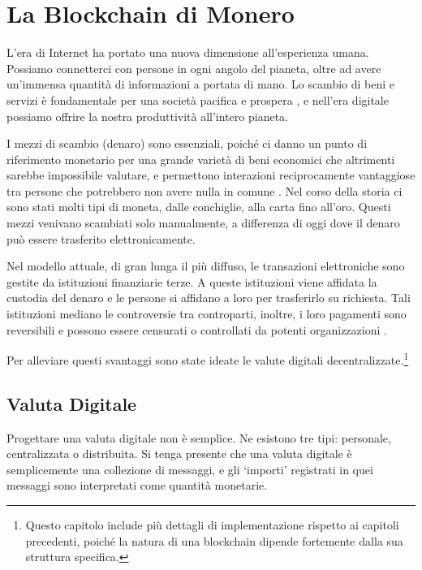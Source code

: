 \chapter{La Blockchain di Monero}
\label{chapter:blockchain}

L’era di Internet ha portato una nuova dimensione all’esperienza umana. Possiamo connetterci con persone in ogni angolo del pianeta, oltre ad avere un’immensa quantità di informazioni a portata di mano. Lo scambio di beni e servizi è fondamentale per una società pacifica e prospera \cite{human-action}, e nell'era digitale possiamo offrire la nostra produttività all’intero pianeta.

I mezzi di scambio (denaro) sono essenziali, poiché ci danno un punto di riferimento monetario per una grande varietà di beni economici che altrimenti sarebbe impossibile valutare, e permettono interazioni reciprocamente vantaggiose tra persone che potrebbero non avere nulla in comune \cite{human-action}. Nel corso della storia ci sono stati molti tipi di moneta, dalle conchiglie, alla carta fino all’oro. Questi mezzi venivano scambiati solo manualmente, a differenza di oggi dove il denaro può essere trasferito elettronicamente.

Nel modello attuale, di gran lunga il più diffuso, le transazioni elettroniche sono gestite da istituzioni finanziarie terze. A queste istituzioni viene affidata la custodia del denaro e le persone si affidano a loro per trasferirlo su richiesta. Tali istituzioni mediano le controversie tra controparti, inoltre, i loro pagamenti sono reversibili e possono essere censurati o controllati da potenti organizzazioni \cite{Nakamoto_bitcoin}.

Per alleviare questi svantaggi sono state ideate le valute digitali decentralizzate.\footnote{Questo capitolo include più dettagli di implementazione rispetto ai capitoli precedenti, poiché la natura di una blockchain dipende fortemente dalla sua struttura specifica.}



\section{Valuta Digitale}
\label{sec:digital-currency}

Progettare una valuta digitale non è semplice. Ne esistono tre tipi: personale, centralizzata o distribuita. Si tenga presente che una valuta digitale è semplicemente una collezione di messaggi, e gli ‘importi’ registrati in quei messaggi sono interpretati come quantità monetarie.


